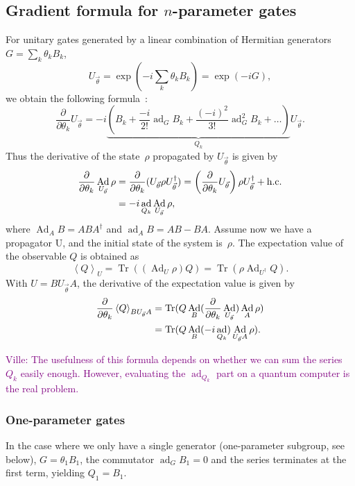 \documentclass[aps,pra,10pt,twocolumn,groupedaddress,nofootinbib]{revtex4-1}
\theoremstyle{plain}
\DeclareMathOperator{\tr}{Tr}
\DeclareMathOperator{\Ad}{Ad}
\DeclareMathOperator{\ad}{ad}
\newcommand{\pd}[2]{\frac{\partial #1}{\partial #2}}  %
\newcommand{\be}{\begin{equation}}
\newcommand{\ee}{\end{equation}}
\newcommand{\expect}[1]{\ensuremath{\left\langle #1 \right\rangle}} %
\newcommand{\ville}[1]{\textcolor{purple}{Ville: #1}}
\begin{document}
\subsection{Gradient formula for $n$-parameter gates}
\label{sec:gradient_formula_for_n_parameter_gates}
For unitary gates generated by a linear combination of Hermitian generators
$G = \sum_k \theta_k B_k$,
\be
U_{\vec{\theta}} = \exp(-i \sum_k \theta_k B_k) = \exp(-i G),
\ee
we obtain the following formula~\cite{dynamo_manual}:
\be
\pd{}{\theta_k} U_{\vec{\theta}}
= -i \underbrace{\left(B_k +\frac{-i}{2!}\ad_G B_k +\frac{(-i)^2}{3!}\ad_G^2 B_k +\ldots \right)}_{Q_k}
U_{\vec{\theta}}.
\ee
Thus the derivative of the state~$\rho$ propagated by $U_{\vec{\theta}}$ is given by
\begin{align}
  \notag
  \pd{}{\theta_k} \Ad_{U_{\vec{\theta}}} \rho
  &= \pd{}{\theta_k} (U_{\vec{\theta}} \rho U_{\vec{\theta}}^\dagger)
  = \left(\pd{}{\theta_k} U_{\vec{\theta}}\right) \rho U_{\vec{\theta}}^\dagger +\text{h.c.}\\
  &= -i \ad_{Q_k} \Ad_{U_{\vec{\theta}}} \rho,
\end{align}
where $\Ad_{A} B = A B A^\dagger$ and $\ad_{A} B = A B - B A$.
Assume now we have a propagator U, and the initial state of the system is~$\rho$.
The expectation value of the observable $Q$ is obtained as
\be
\expect{Q}_U = \tr((\Ad_{U}\rho) Q)
= \tr(\rho \Ad_{U^\dagger}Q).
\ee
With $U=B U_{\vec{\theta}} A$, the derivative of the expectation value is given by
\begin{align}
  \label{eq:d_ev}
  \notag
  \pd{}{\theta_k} \expect{Q}_{B U_{\vec{\theta}} A}
  &= \tr(Q \Ad_B (\pd{}{\theta_k} \Ad_{U_{\vec{\theta}}}) \Ad_A \rho)\\
  &= \tr(Q \Ad_B (-i \ad_{Q_k}) \Ad_{U_{\vec{\theta}} A} \rho).
\end{align}

\ville{The usefulness of this formula depends on whether we can sum the series~$Q_k$ easily enough.
  However, evaluating the $\ad_{Q_k}$ part on a quantum computer is the real problem.
}

\subsubsection{One-parameter gates}

In the case where we only have a single generator (one-parameter subgroup, see below),
$G = \theta_1 B_1$, the commutator $\ad_G B_1 = 0$
and the series terminates at the first term, yielding
$Q_1 = B_1$.
\end{document}
